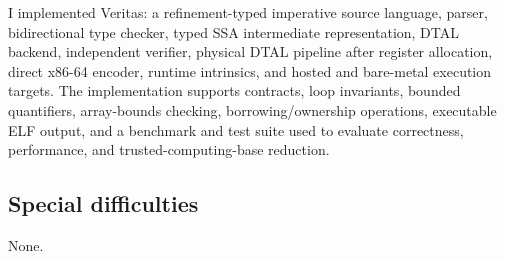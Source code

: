 I implemented Veritas: a refinement-typed imperative source language, parser, bidirectional type checker, typed SSA intermediate representation, DTAL backend, independent verifier, physical DTAL pipeline after register allocation, direct x86-64 encoder, runtime intrinsics, and hosted and bare-metal execution targets. The implementation supports contracts, loop invariants, bounded quantifiers, array-bounds checking, borrowing/ownership operations, executable ELF output, and a benchmark and test suite used to evaluate correctness, performance, and trusted-computing-base reduction.

\subsection*{Special difficulties}
None.
